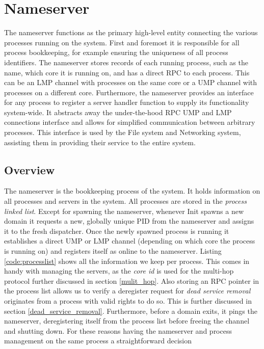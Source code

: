 

\section{Nameserver}\label{nameserver}
The nameserver functions as the primary high-level entity connecting the various processes running on the system. First and foremost it is responsible for all process bookkeeping, for example ensuring the uniqueness of all process identifiers. The nameserver stores records of each running process, such as the name, which core it is running on, and has a direct RPC to each process. This can be an LMP channel with processes on the same core or a UMP channel with processes on a different core. Furthermore, the nameserver provides an interface for any process to register a server handler function to supply its functionality system-wide. It abstracts away the under-the-hood RPC UMP and LMP connections interface and allows for simplified communication between arbitrary processes. This interface is used by the File system and Networking system, assisting them in providing their service to the entire system.


\subsection{Overview}

The nameserver is the bookkeeping process of the system. It holds information on all processes and servers in the system. All processes are stored in the \textit{process linked list}. Except for spawning the nameserver, whenever Init spawns a new domain it requests a new, globally unique PID from the nameserver and assigns it to the fresh dispatcher. Once the newly spawned process is running it establishes a direct UMP or LMP channel (depending on which core the process is running on) and registers itself as online to the nameserver. Listing \ref{code:processlist} shows all the information we keep per process. This comes in handy with managing the servers, as the \textit{core id} is used for the multi-hop protocol further discussed in section \ref{mulit_hop}. Also storing an RPC pointer in the process list allows us to verify a deregister request for \textit{dead service removal} originates from a process with valid rights to do so. This is further discussed in section \ref{dead_service_removal}. Furthermore, before a domain exits, it pings the nameserver, deregistering itself from the process list before freeing the channel and shutting down. For these reasons having the nameserver and process management on the same process a straightforward decision  

